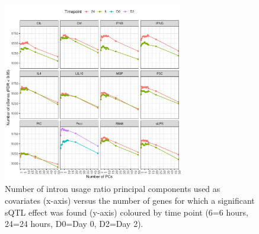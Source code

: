 \begin{figure}[H]
  \centering
  \includegraphics[width=0.7\textwidth]{num_sgenes_PCs}
  \caption[Number of principal components used in sQTL mapping and number of discovered sGenes]{Number of intron usage ratio principal components used as
  covariates (x-axis) versus the number of genes for which a significant sQTL effect was found
  (y-axis) coloured by time point (6=6 hours, 24=24 hours, D0=Day 0, D2=Day 2).}
  \label{fig:num_sgenes_PCs}   
\end{figure}




